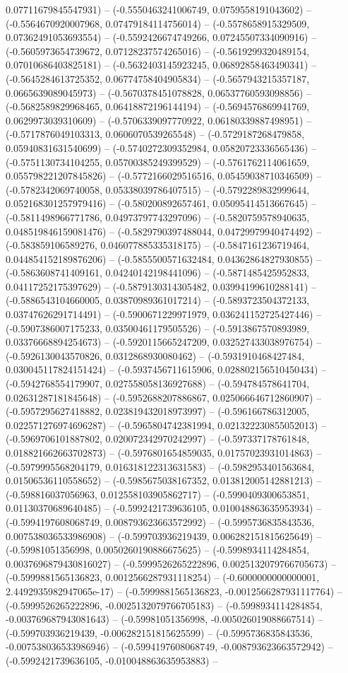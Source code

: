 0.07711679845547931) -- (-0.5550463241006749, 0.0759558191043602) -- (-0.5564670920007968, 0.07479184114756014) -- (-0.5578658915329509, 0.07362491053693554) -- (-0.5592426674749266, 0.07245507334090916) -- (-0.5605973654739672, 0.07128237574265016) -- (-0.5619299320489154, 0.07010686403825181) -- (-0.5632403145923245, 0.06892858463490341) -- (-0.5645284613725352, 0.06774758404905834) -- (-0.5657943215357187, 0.0665639089045973) -- (-0.5670378451078828, 0.06537760593098856) -- (-0.5682589829968465, 0.06418872196144194) -- (-0.5694576869941769, 0.0629973039310609) -- (-0.5706339097770922, 0.06180339887498951) -- (-0.5717876049103313, 0.0606070539265548) -- (-0.5729187268479858, 0.05940831631540699) -- (-0.5740272309352984, 0.05820723336565436) -- (-0.5751130734104255, 0.05700385249399529) -- (-0.5761762114061659, 0.055798221207845826) -- (-0.5772166029516516, 0.05459038710346509) -- (-0.5782342069740058, 0.05338039786407515) -- (-0.5792289832999644, 0.052168301257979416) -- (-0.580200892657461, 0.05095414513667645) -- (-0.5811498966771786, 0.04973797743297096) -- (-0.5820759578940635, 0.048519846159081476) -- (-0.5829790397488044, 0.04729979940474492) -- (-0.583859106589276, 0.046077885335318175) -- (-0.5847161236719464, 0.044854152189876206) -- (-0.5855500571632484, 0.04362864827930855) -- (-0.5863608741409161, 0.04240142198441096) -- (-0.5871485425952833, 0.04117252175397629) -- (-0.5879130314305482, 0.03994199610288141) -- (-0.5886543104660005, 0.03870989361017214) -- (-0.5893723504372133, 0.03747626291714491) -- (-0.5900671229971979, 0.036241152725427446) -- (-0.5907386007175233, 0.03500461179505526) -- (-0.5913867570893989, 0.03376668894254673) -- (-0.5920115665247209, 0.032527433038976754) -- (-0.5926130043570826, 0.0312868930080462) -- (-0.5931910468427484, 0.030045117824151424) -- (-0.5937456711615906, 0.028802156510450434) -- (-0.5942768554179907, 0.027558058136927688) -- (-0.594784578641704, 0.02631287181845648) -- (-0.5952688207886867, 0.025066646712860907) -- (-0.5957295627418882, 0.023819432018973997) -- (-0.596166786312005, 0.022571276974696287) -- (-0.5965804742381994, 0.021322230855052013) -- (-0.5969706101887802, 0.020072342970242997) -- (-0.597337178761848, 0.018821662663702873) -- (-0.5976801654859035, 0.01757023931014863) -- (-0.5979995568204179, 0.016318122313631583) -- (-0.5982953401563684, 0.01506536110558652) -- (-0.5985675038167352, 0.013812005142881213) -- (-0.598816037056963, 0.012558103905862717) -- (-0.5990409300653851, 0.01130370689640485) -- (-0.5992421739636105, 0.010048863635953934) -- (-0.5994197608068749, 0.008793623663572992) -- (-0.5995736835843536, 0.007538036533986908) -- (-0.599703936219439, 0.006282151815625649) -- (-0.59981051356998, 0.0050260190886675625) -- (-0.5998934114284854, 0.0037696879430816027) -- (-0.5999526265222896, 0.0025132079766705673) -- (-0.5999881565136823, 0.0012566287931118254) -- (-0.6000000000000001, 2.4492935982947065e-17) -- (-0.5999881565136823, -0.0012566287931117764) -- (-0.5999526265222896, -0.0025132079766705183) -- (-0.5998934114284854, -0.003769687943081643) -- (-0.59981051356998, -0.005026019088667514) -- (-0.599703936219439, -0.006282151815625599) -- (-0.5995736835843536, -0.007538036533986946) -- (-0.5994197608068749, -0.008793623663572942) -- (-0.5992421739636105, -0.010048863635953883) -- 
